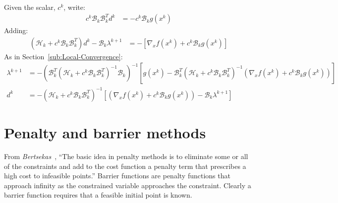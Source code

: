 \documentclass[a4paper,twoside,10pt,english]{report}
\begin{document}
Given the scalar, $c^{k}$, write:
\begin{align*}
c^{k}\mathcal{B}_{k}\mathcal{B}_{k}^{T}d^{k} &= -c^{k}\mathcal{B}_{k}g\left(x^{k}\right)
\end{align*}
Adding:
\begin{align*}
\left(\mathcal{H}_{k}+c^{k}\mathcal{B}_{k}\mathcal{B}_{k}^{T}\right)d^{k}-
\mathcal{B}_{k}\lambda^{k+1} &= 
-\left[\nabla_{x}f\left(x^{k}\right)+c^{k}\mathcal{B}_{k}g\left(x^{k}\right)\right]
\end{align*}
As in Section~\ref{sub:Local-Convergence}:
\begin{align*}
\lambda^{k+1} &= -\left(\mathcal{B}_{k}^{T}\left(\mathcal{H}_{k}+c^{k}\mathcal{B}_{k}\mathcal{B}_{k}^{T}\right)^{-1}\mathcal{B}_{k}\right)^{-1}\left[g\left(x^{k}\right)-\mathcal{B}_{k}^{T}\left(\mathcal{H}_{k}+c^{k}\mathcal{B}_{k}\mathcal{B}_{k}^{T}\right)^{-1}\left(\nabla_{x}f\left(x^{k}\right)+c^{k}\mathcal{B}_{k}g\left(x^{k}\right)\right)\right]\\
d^{k} &= -\left(\mathcal{H}_{k}+c^{k}\mathcal{B}_{k}\mathcal{B}_{k}^{T}\right)^{-1}\left[\left(\nabla_{x}f\left(x^{k}\right)+c^{k}\mathcal{B}_{k}g\left(x^{k}\right)\right)-\mathcal{B}_{k}\lambda^{k+1}\right]
\end{align*}
\section{Penalty and barrier methods}
From \emph{Bertsekas}~\cite[Section 4.2]{Bertsekas_NonlinearProgramming},
``The basic idea in penalty methods is to eliminate some or all of
the constraints and add to the cost function a penalty term that prescribes
a high cost to infeasible points.'' Barrier functions are penalty
functions that approach infinity as the constrained variable approaches
the constraint. Clearly a barrier function requires that a feasible
initial point is known.
\end{document}
